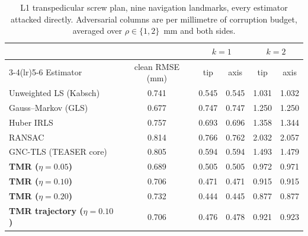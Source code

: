 \begin{table}[t]
\centering\footnotesize
\caption{L1 transpedicular screw plan, nine navigation landmarks, every estimator attacked directly. Adversarial columns are per millimetre of corruption budget, averaged over $\rho\in\{1,2\}$~mm and both sides.}
\label{tab:vertebra}
\begin{tabular}{@{}lccccc@{}}
\toprule
& & \multicolumn{2}{c}{$k=1$} & \multicolumn{2}{c}{$k=2$} \\
\cmidrule(lr){3-4}\cmidrule(lr){5-6}
Estimator & clean RMSE (mm) & tip & axis & tip & axis \\
\midrule
Unweighted LS (Kabsch) & 0.741 & 0.545 & 0.545 & 1.031 & 1.032 \\
Gauss--Markov (GLS) & 0.677 & 0.747 & 0.747 & 1.250 & 1.250 \\
Huber IRLS & 0.757 & 0.693 & 0.696 & 1.358 & 1.344 \\
RANSAC & 0.814 & 0.766 & 0.762 & 2.032 & 2.057 \\
GNC-TLS (TEASER core) & 0.805 & 0.594 & 0.594 & 1.493 & 1.479 \\
\midrule
\textbf{TMR ($\eta=0.05$)} & 0.689 & 0.505 & 0.505 & 0.972 & 0.971 \\
\textbf{TMR ($\eta=0.10$)} & 0.706 & 0.471 & 0.471 & 0.915 & 0.915 \\
\textbf{TMR ($\eta=0.20$)} & 0.732 & 0.444 & 0.445 & 0.877 & 0.877 \\
\textbf{TMR trajectory ($\eta=0.10$)} & 0.706 & 0.476 & 0.478 & 0.921 & 0.923 \\
\bottomrule
\end{tabular}
\end{table}
